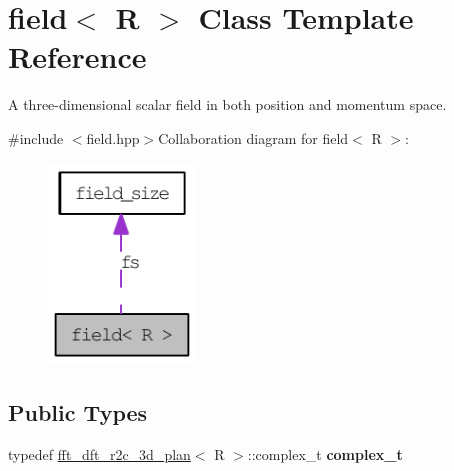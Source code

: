 \hypertarget{classfield}{
\section{field$<$ R $>$ Class Template Reference}
\label{classfield}
}


A three-\/dimensional scalar field in both position and momentum space.  


{\ttfamily \#include $<$field.hpp$>$}Collaboration diagram for field$<$ R $>$:\nopagebreak
\begin{figure}[H]
\begin{center}
\leavevmode
\includegraphics[width=110pt]{classfield__coll__graph}
\end{center}
\end{figure}
\subsection*{Public Types}
\begin{DoxyCompactItemize}
\item 
\hypertarget{classfield_a4783d2c59b62ef73a4c3f4f7ca0b2fb7}{
typedef \hyperlink{classfft__dft__r2c__3d__plan}{fft\_\-dft\_\-r2c\_\-3d\_\-plan}$<$ R $>$::complex\_\-t {\bfseries complex\_\-t}}
\label{classfield_a4783d2c59b62ef73a4c3f4f7ca0b2fb7}

\end{DoxyCompactItemize}

